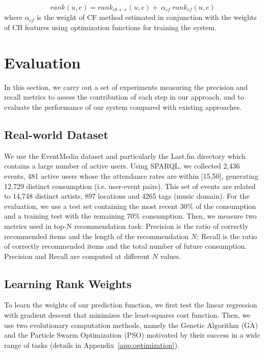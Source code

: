 \begin{equation}\label{eq:hybrid}
rank(u,e)= rank_{cb++}(u,e) + \ \alpha_{cf}\ rank_{cf}(u,e)
\end{equation}
where $\alpha_{cf}$ is the weight of CF method estimated in conjunction with the weights of CB features using optimization functions for training the system.



\section{Evaluation}
\label{sec:evaluation}
In this section, we carry out a set of experiments measuring the precision and recall metrics to assess the contribution of each step in our approach, and to evaluate the performance of our system compared with existing approaches.


\subsection{Real-world Dataset}
We use the EventMedia dataset and particularly the Last.fm directory which contains a large number of active users. Using SPARQL, we collected 2,436 events, 481 active users whose the attendance rates are within [15,50], generating 12,729 distinct consumption (i.e. user-event pairs). This set of events are related to 14,748 distinct artists, 897 locations and 4265 tags (music domain). For the evaluation, we use a test set containing the most recent 30\% of the consumption and a training test with the remaining 70\% consumption. Then, we measure two metrics used in top-N recommendation task: Precision is the ratio of correctly recommended items and the length of the recommendation $N$; Recall is the ratio of correctly recommended items and the total number of future consumption. Precision and Recall are computed at different $N$ values.


\subsection{Learning Rank Weights}
\label{sec:learning}
To learn the weights of our prediction function, we first test the linear regression with gradient descent that minimizes the least-squares cost function. Then, we use two evolutionary computation methods, namely the Genetic Algorithm (GA) and the Particle Swarm Optimization (PSO) motivated by their success in a wide range of tasks (details in Appendix~\ref{app:optimization}).

